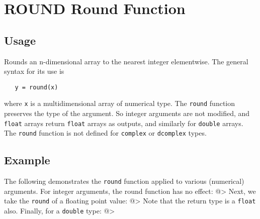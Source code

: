\section{ROUND Round Function}

\subsection{Usage}

Rounds an n-dimensional array to the nearest integer elementwise.
The general syntax for its use is
\begin{verbatim}
   y = round(x)
\end{verbatim}
where \verb|x| is a multidimensional array of numerical type.  The \verb|round| 
function preserves the type of the argument.  So integer arguments 
are not modified, and \verb|float| arrays return \verb|float| arrays as 
outputs, and similarly for \verb|double| arrays.  The \verb|round| function 
is not defined for \verb|complex| or \verb|dcomplex| types.
\subsection{Example}

The following demonstrates the \verb|round| function applied to various
(numerical) arguments.  For integer arguments, the round function has
no effect:
@>
Next, we take the \verb|round| of a floating point value:
@>
Note that the return type is a \verb|float| also.  Finally, for a \verb|double|
type:
@>

